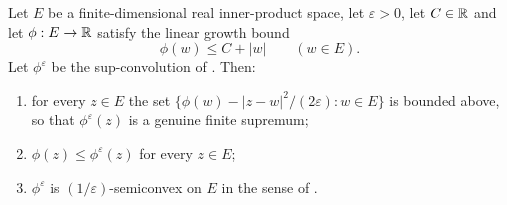 \begin{lemma}
Let $E$ be a finite-dimensional real inner-product space, let
$\varepsilon>0$, let $C\in\mathbb{R}$ and let $\phi:E\to\mathbb{R}$ satisfy the linear growth
bound
\[
  \phi(w)\le C+|w|\qquad(w\in E).
\]
Let $\phi^\varepsilon$ be the sup-convolution of . Then:
\begin{enumerate}
\item for every $z\in E$ the set
$\bigl\{\phi(w)-|z-w|^2/(2\varepsilon):w\in E\bigr\}$ is bounded above, so that
$\phi^\varepsilon(z)$ is a genuine finite supremum;
\item $\phi(z)\le\phi^\varepsilon(z)$ for every $z\in E$;
\item $\phi^\varepsilon$ is $(1/\varepsilon)$-semiconvex on $E$ in the sense of
.
\end{enumerate}
\end{lemma}
